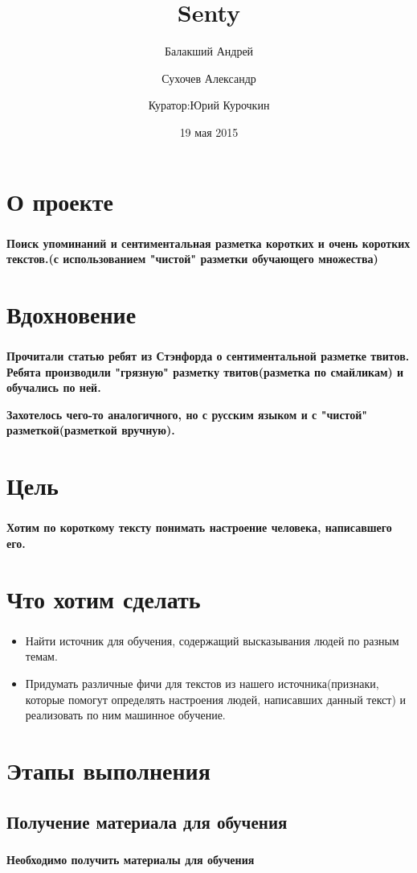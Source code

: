 \documentclass[t]{beamer}
\title{Senty}
\author{Балакший Андрей \and Сухочев Александр 
	\and \newline Куратор:Юрий Курочкин}
\date{19 мая 2015}
\institute[Computer Science Center]
\begin{document}
	\frame[plain]{\titlepage}
	
	
	\section{О проекте}
	\begin{frame}
		\frametitle{\insertsection}
		\textbf{Поиск упоминаний и сентиментальная разметка коротких и 	очень коротких текстов.(с использованием "чистой" разметки обучающего множества)}
	\end{frame}
	
	
	\section{Вдохновение}
	\begin{frame}
		\frametitle{\insertsection}
		\textbf{Прочитали статью ребят из Стэнфорда о сентиментальной разметке твитов. Ребята производили "грязную" разметку твитов(разметка по смайликам) и обучались по ней.}\pause
		
		\textbf{Захотелось чего-то аналогичного, но с русским языком и с "чистой" разметкой(разметкой вручную).}
	\end{frame}
	
	
	\section{Цель}
	\begin{frame}
		\frametitle{\insertsection}
		\textbf{Хотим по короткому тексту понимать настроение человека, написавшего его.}
	\end{frame}
	
	
	\section{Что хотим сделать}
	\begin{frame}
		\frametitle{\insertsection}
		\begin{itemize}
			\item Найти источник для обучения, содержащий высказывания людей по разным темам.	
			\item Придумать различные фичи для текстов из нашего источника(признаки, которые помогут определять настроения людей, написавших данный текст) и реализовать по ним машинное обучение.
		\end{itemize}
	\end{frame}
	
	
	\section{Этапы выполнения}
	\subsection{Получение материала для обучения}
	\begin{frame}
		\frametitle{\insertsection}
		\framesubtitle{\insertsubsection}
		\textbf{Необходимо получить материалы для обучения}
	\end{frame}
	
	
	
	
	
\end{document}
